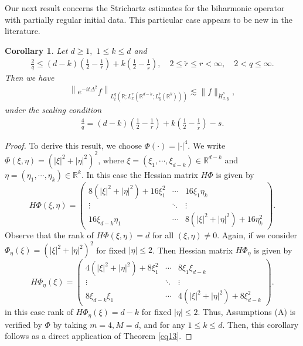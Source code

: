 \documentclass[a4paper,11pt, reqno]{amsart}
\newtheorem{cor}[theorem]{Corollary}
\theoremstyle{definition}
\theoremstyle{remark}
\numberwithin{equation}{section}
\begin{document}
Our next result concerns the Strichartz estimates for the biharmonic operator with partially regular initial data. This particular case appears to be new in the literature.
            \begin{cor} \label{biha} Let $d \geq 1,$ $1 \leq k \leq d$ and \begin{align*}
				\frac{2}{q} \leq(d-k)\left(\frac{1}{2}-\frac{1}{r}\right)+k\left(\frac{1}{2}-\frac{1}{\widetilde{r}}\right), \quad 2 \leq \widetilde{r} \leq r<\infty, \quad 2<q \leq \infty. 
			\end{align*}
            Then we have 
			\begin{align*}
				\left\|e^{-i t \Delta^2} f\right\|_{L_t^q\left(\mathbb{R} ; L_x^r\left(\mathbb{R}^{d-k} ; L_y^{\tilde{r}}\left(\mathbb{R}^k\right)\right)\right)} \lesssim \|f\|_{\dot{H}_{x, y}^s},
			\end{align*}
			under  the scaling condition
			\begin{align*}
				\frac{{{4}}}{q}=(d-k)\left(\frac{1}{2}-\frac{1}{r}\right)+k\left(\frac{1}{2}-\frac{1}{\widetilde{r}}\right)-s.
			\end{align*}
	           \end{cor}
               \begin{proof} To derive this result, we choose  $\Phi(\cdot)=|\cdot|^4.$	 We write   $\Phi(\xi, \eta)=(|\xi|^2+|\eta|^2)^{2}$, where $\xi=(\xi_1, \cdots, \xi_{d-k})\in \mathbb{R}^{d-k}$ and $\eta=(\eta_1, \cdots, \eta_{k})\in \mathbb{R}^{k}.$  In this case  the Hessian matrix $H \Phi$ is given by 
               $$
					H \Phi  (\xi, \eta ) =  
					\begin{pmatrix}
						8(	|\xi|^2 + |\eta|^2) +16\xi_1^2  &   \cdots  &   16\xi_1 \eta_{k} \\
						\vdots     &   \ddots    &   \vdots \\
						16\xi_{d-k} \eta_{1}    &   \cdots &   	8(	|\xi|^2 + |\eta|^2)  +16\eta_{k}^2
					\end{pmatrix} .
					$$
                    Observe that the rank    of $H \Phi  (\xi, \eta ) =d$ for all $(\xi, \eta) \neq 0.$
                    Again, if we consider $\Phi_\eta  (\xi )=(|\xi|^2+|\eta|^2)^{2}$ for fixed     	 $|\eta| \leq 2$. Then Hessian matrix $H \Phi_\eta $ is given by   	$$H \Phi_\eta  (\xi ) =  
					\begin{pmatrix}
						4(	|\xi|^2 + |\eta|^2) +8\xi_1^2  &   \cdots  &   8\xi_1 \xi_{d-k} \\
						\vdots     &   \ddots    &   \vdots \\
						8\xi_{d-k} \xi_{1}    &   \cdots &   	4(	|\xi|^2 + |\eta|^2)  +8\xi_{d-k}^2
					\end{pmatrix} .
					$$
					in this case rank of $H \Phi_\eta  (\xi ) =d-k$ for fixed     	 $|\eta| \leq 2$.
               Thus, Assumptions (A) is verified by $\Phi$ by taking      $m=4, M=d$,  and   for any $1 \leq k \leq d.$  Then, this corollary follows as a direct application of Theorem \ref{eq13}.
               \end{proof}
 
\end{document}

